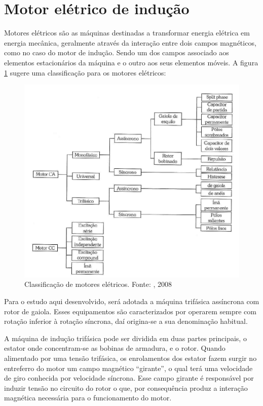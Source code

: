 \documentclass[a4paper, 12pt,oneside, english, brazil]{abntex2}
\begin{document}
\section{Motor elétrico de indução}

Motores elétricos são as máquinas destinadas a transformar energia elétrica em energia mecânica, geralmente através da interação entre dois campos magnéticos, como no caso do motor de indução. Sendo um dos campos associado aos elementos estacionários da máquina e o outro aos seus elementos móveis. A figura \ref{clas} sugere uma classificação para os motores elétricos:

\begin{figure}[H]
    \centering
    \includegraphics[scale=0.36]{clas.png}
    \caption{Classificação de motores elétricos. Fonte: \protect{}, 2008}
    \label{clas}
\end{figure}

Para o estudo aqui desenvolvido, será adotada a máquina trifásica assíncrona com rotor de gaiola. Esses equipamentos são caracterizados por operarem sempre com rotação inferior à rotação síncrona, daí origina-se a sua denominação habitual.    

A máquina de indução trifásica pode ser dividida em duas partes principais, o estator onde concentram-se as bobinas de armadura, e o rotor. Quando alimentado por uma tensão trifásica, os enrolamentos dos estator fazem surgir no entreferro do motor um campo magnético “girante”, o qual terá uma velocidade de giro conhecida por velocidade síncrona. Esse campo girante é responsável por induzir tensão no circuito do rotor o que, por consequência produz a interação magnética necessária para o funcionamento do motor.
\end{document}

